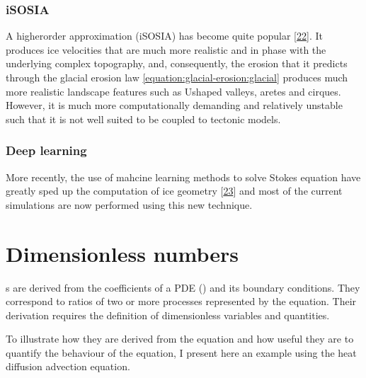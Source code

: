 \documentclass[letterpaper,10pt,english]{jupyterBook}
\begin{document}
\subsubsection{iSOSIA}
\label{\detokenize{glacial-models:isosia}}
\sphinxAtStartPar
A higher\sphinxhyphen{}order approximation (iSOSIA) has become quite popular {[}\hyperlink{cite.references:id17}{22}{]}. It produces ice velocities that are much more realistic and in phase with the underlying complex topography, and, consequently, the erosion that it predicts through the glacial erosion law \eqref{equation:glacial-erosion:glacial} produces much more realistic landscape features such as U\sphinxhyphen{}shaped valleys, aretes and cirques. However, it is much more computationally demanding and relatively unstable such that it is not well suited to be coupled to tectonic models.


\subsubsection{Deep learning}
\label{\detokenize{glacial-models:deep-learning}}
\sphinxAtStartPar
More recently, the use of mahcine learning methods to solve Stokes equation have greatly sped up the computation of ice geometry {[}\hyperlink{cite.references:id18}{23}{]} and most of the current simulations are now performed using this new technique.

\sphinxstepscope


\section{Dimensionless numbers}
\label{\detokenize{dimension:dimensionless-numbers}}\label{\detokenize{dimension:dimension-section}}\label{\detokenize{dimension::doc}}
\sphinxAtStartPar
{\hyperref[\detokenize{glossary:term-Dimensionless-number}]{}}s are derived from the coefficients of a PDE ({\hyperref[\detokenize{glossary:term-Partial-differential-equation}]{}}) and its boundary conditions. They correspond to ratios of two or more processes represented by the equation. Their derivation requires the definition of dimensionless variables and quantities.

\sphinxAtStartPar
To illustrate how they are derived from the equation and how useful they are to quantify the behaviour of the equation, I present here an example using the heat diffusion advection equation.
\end{document}
